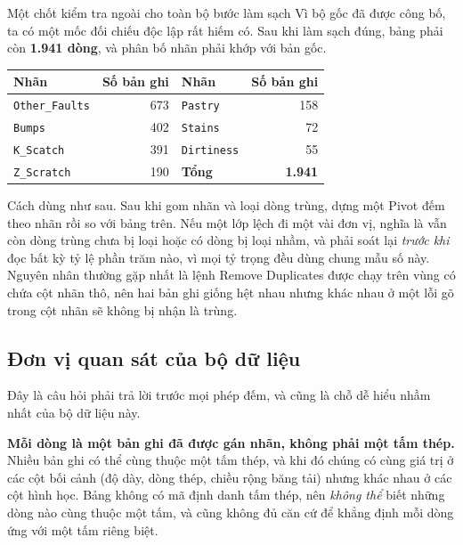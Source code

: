 \documentclass[12pt]{article}
\begin{document}
\begin{guidelinebox}{Một chốt kiểm tra ngoài cho toàn bộ bước làm sạch}
Vì bộ gốc đã được công bố, ta có một mốc đối chiếu độc lập rất hiếm có. Sau khi làm sạch đúng, bảng phải còn \textbf{1.941 dòng}, và phân bố nhãn phải khớp với bản gốc.

\begin{center}
\small
\begin{tabular}{@{}lrlr@{}}
\toprule
\textbf{Nhãn} & \textbf{Số bản ghi} & \textbf{Nhãn} & \textbf{Số bản ghi} \\
\midrule
\texttt{Other\_Faults} & 673 & \texttt{Pastry}    & 158 \\
\texttt{Bumps}         & 402 & \texttt{Stains}    & 72 \\
\texttt{K\_Scatch}     & 391 & \texttt{Dirtiness} & 55 \\
\texttt{Z\_Scratch}    & 190 & \textbf{Tổng}      & \textbf{1.941} \\
\bottomrule
\end{tabular}
\end{center}

\noindent Cách dùng như sau. Sau khi gom nhãn và loại dòng trùng, dựng một Pivot đếm theo nhãn rồi so với bảng trên. Nếu một lớp lệch đi một vài đơn vị, nghĩa là vẫn còn dòng trùng chưa bị loại hoặc có dòng bị loại nhầm, và phải soát lại \emph{trước khi} đọc bất kỳ tỷ lệ phần trăm nào, vì mọi tỷ trọng đều dùng chung mẫu số này. Nguyên nhân thường gặp nhất là lệnh Remove Duplicates được chạy trên vùng có chứa cột nhãn thô, nên hai bản ghi giống hệt nhau nhưng khác nhau ở một lỗi gõ trong cột nhãn sẽ không bị nhận là trùng.
\end{guidelinebox}

\subsection{Đơn vị quan sát của bộ dữ liệu}

Đây là câu hỏi phải trả lời trước mọi phép đếm, và cũng là chỗ dễ hiểu nhầm nhất của bộ dữ liệu này.

\noindent \textbf{Mỗi dòng là một bản ghi đã được gán nhãn, không phải một tấm thép.} Nhiều bản ghi có thể cùng thuộc một tấm thép, và khi đó chúng có cùng giá trị ở các cột bối cảnh (độ dày, dòng thép, chiều rộng băng tải) nhưng khác nhau ở các cột hình học. Bảng không có mã định danh tấm thép, nên \emph{không thể} biết những dòng nào cùng thuộc một tấm, và cũng không đủ căn cứ để khẳng định mỗi dòng ứng với một tấm riêng biệt.
\end{document}
